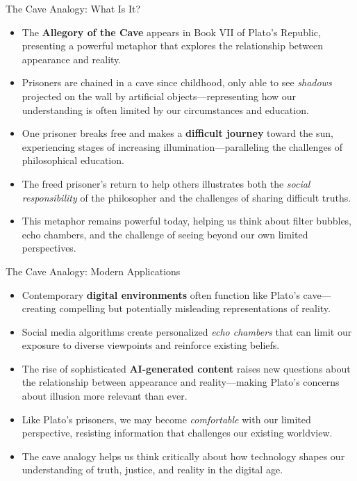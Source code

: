 \documentclass[aspectratio=169]{beamer}
\begin{document}
\begin{frame}{The Cave Analogy: What Is It?}
\begin{itemize}
\item The \textbf{Allegory of the Cave} appears in Book VII of Plato's Republic, presenting a powerful metaphor that explores the relationship between appearance and reality.
\item Prisoners are chained in a cave since childhood, only able to see \emph{shadows} projected on the wall by artificial objects—representing how our understanding is often limited by our circumstances and education.
\item One prisoner breaks free and makes a \textbf{difficult journey} toward the sun, experiencing stages of increasing illumination—paralleling the challenges of philosophical education.
\item The freed prisoner's return to help others illustrates both the \emph{social responsibility} of the philosopher and the challenges of sharing difficult truths.
\item This metaphor remains powerful today, helping us think about filter bubbles, echo chambers, and the challenge of seeing beyond our own limited perspectives.
\end{itemize}
\end{frame}

\begin{frame}{The Cave Analogy: Modern Applications}
\begin{itemize}
\item Contemporary \textbf{digital environments} often function like Plato's cave—creating compelling but potentially misleading representations of reality.
\item Social media algorithms create personalized \emph{echo chambers} that can limit our exposure to diverse viewpoints and reinforce existing beliefs.
\item The rise of sophisticated \textbf{AI-generated content} raises new questions about the relationship between appearance and reality—making Plato's concerns about illusion more relevant than ever.
\item Like Plato's prisoners, we may become \emph{comfortable} with our limited perspective, resisting information that challenges our existing worldview.
\item The cave analogy helps us think critically about how technology shapes our understanding of truth, justice, and reality in the digital age.
\end{itemize}
\end{frame}
\end{document}
